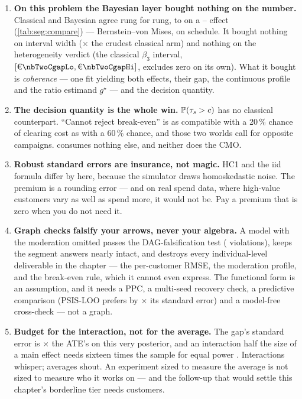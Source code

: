\begin{enumerate}[leftmargin=*, itemsep=.45em]
  \item \textbf{On this problem the Bayesian layer bought nothing on the number.} Classical and
        Bayesian agree rung for rung, to \eur{\nbTwoMaxPairGap} on a
        \eur{\nbTwoTrueLow}--\eur{\nbTwoTrueHigh} effect
        (\cref{tab:seg:compare}) --- Bernstein--von Mises, on schedule. It bought nothing on interval
        width (\nbTwoWidthRatio$\times$ the crudest classical arm) and nothing on the heterogeneity
        verdict (the classical $\beta_3$ interval, $[\eur{\nbTwoCgapLo}, \eur{\nbTwoCgapHi}]$,
        excludes zero on its own). What it bought is \emph{coherence} --- one fit yielding both
        effects, their gap, the continuous profile and the ratio estimand $g^\star$ --- and the
        decision quantity.

  \item \textbf{The decision quantity is the whole win.} $\operatorname{\mathbb{P}}(\tau_s > c)$ has no classical
        counterpart. ``Cannot reject break-even'' is as compatible with a 20\,\% chance of clearing
        cost as with a 60\,\% chance, and those two worlds call for opposite campaigns.
         consumes nothing else, and neither does the CMO.

  \item \textbf{Robust standard errors are insurance, not magic.} HC1 and the iid formula differ by
        \pc{\nbTwoSeGapPct} here, because the simulator draws homoskedastic noise. The premium is a
        rounding error --- and on real spend data, where high-value customers vary as well as spend
        more, it would not be. Pay a premium that is zero when you do not need it.

  \item \textbf{Graph checks falsify your arrows, never your algebra.} A model with the moderation
        omitted passes the DAG-falsification test (\nbTwoDagBadViolations{} violations), keeps the
        segment answers nearly intact, and destroys every individual-level deliverable in the
        chapter --- the per-customer RMSE, the moderation profile, and the break-even rule, which it
        cannot even express. The functional form is an assumption, and it needs a PPC, a multi-seed
        recovery check, a predictive comparison (PSIS-LOO prefers \nbTwoLooWinner{} by
        \nbTwoLooRatio$\times$ its standard error) and a model-free cross-check --- not a graph.

  \item \textbf{Budget for the interaction, not for the average.} The gap's standard error is
        \nbTwoGapSdRatio$\times$ the ATE's on this very posterior, and an interaction half the size
        of a main effect needs sixteen times the sample for equal power
        \citep{gelman2018interactions}. Interactions whisper; averages shout. An experiment sized to
        measure the average is not sized to measure who it works on --- and the follow-up that would
        settle this chapter's borderline tier needs \nbTwoNFollowup{} customers.
\end{enumerate}

